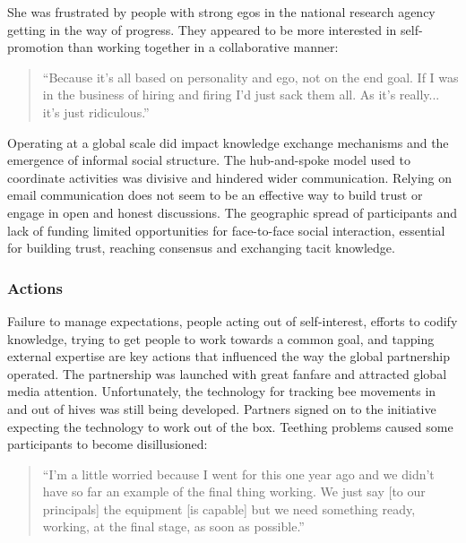 She was frustrated by people with strong egos in the national research agency getting in the way of progress. They appeared to be more interested in self-promotion than working together in a collaborative manner: 

\begin{quote}
\small
\enquote{Because it's all based on personality and ego, not on the end goal. If I was in the business of hiring and firing I'd just sack them all. As it's really... it's just ridiculous.} \\
\end{quote}

Operating at a global scale did impact knowledge exchange mechanisms and the emergence of informal social structure. The hub-and-spoke model used to coordinate activities was divisive and hindered wider communication. Relying on email communication does not seem to be an effective way to build trust or engage in open and honest discussions. The geographic spread of participants and lack of funding limited opportunities for face-to-face social interaction, essential for building trust, reaching consensus and exchanging tacit knowledge. 

\subsubsection{Actions}

Failure to manage expectations, people acting out of self-interest, efforts to codify knowledge, trying to get people to work towards a common goal, and tapping external expertise are key actions that influenced the way the global partnership operated. The partnership was launched with great fanfare and attracted global media attention. Unfortunately, the technology for tracking bee movements in and out of hives was still being developed. Partners signed on to the initiative expecting the technology to work out of the box. Teething problems caused some participants to become disillusioned:

\begin{quote}
\small
\enquote{I'm a little worried because I went for this one year ago and we didn't have so far an example of the final thing working. We just say [to our principals] the equipment [is capable] but we need something ready, working, at the final stage, as soon as possible.} \\
\end{quote}

